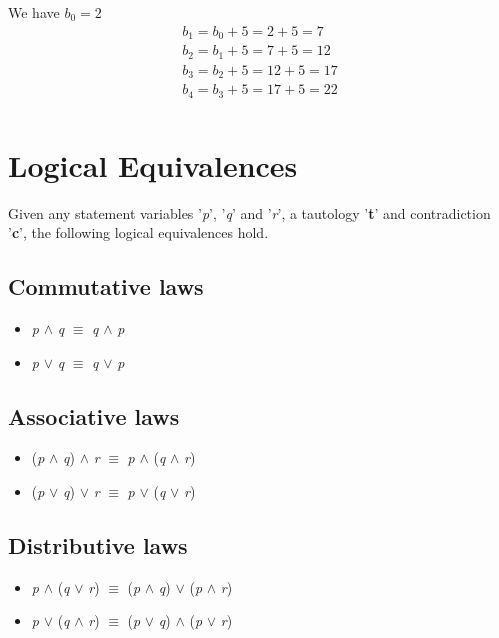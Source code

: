 \documentclass{article}
\begin{document}
We have $b_{0} = 2$
\begin{align}
b_{1} = b_{0} + 5 = 2 + 5 = 7 \\
b_{2} = b_{1} + 5 = 7 + 5 = 12 \\
b_{3} = b_{2} + 5 = 12 + 5 = 17 \\
b_{4} = b_{3} + 5 = 17 + 5 = 22 \\
\end{align}

\section{Logical Equivalences}

Given any statement variables '\textit{p}', '\textit{q}' and '\textit{r}', a tautology '\textbf{t}' and contradiction '\textbf{c}', the following
logical equivalences hold.


\subsection{Commutative laws}
\begin{itemize} 
\item \textit{p} $\wedge$ \textit{q} $\equiv$ \textit{q} $\wedge$ \textit{p}
\item \textit{p} $\lor$ \textit{q} $\equiv$ \textit{q} $\lor$ \textit{p}
\end{itemize}

\subsection{Associative laws}
\begin{itemize}
\item (\textit{p} $\wedge$ \textit{q}) $\wedge$ \textit{r} $\equiv$ \textit{p} $\wedge$ (\textit{q} $\wedge$ \textit{r})
\item (\textit{p} $\lor$ \textit{q}) $\lor$ \textit{r} $\equiv$ \textit{p} $\lor$ (\textit{q} $\lor$ \textit{r})
\end{itemize}

\subsection{Distributive laws}
\begin{itemize}
\item \textit{p} $\wedge$ (\textit{q} $\lor$ \textit{r}) $\equiv$ (\textit{p} $\wedge$ \textit{q}) $\lor$ (\textit{p} $\wedge$ \textit{r})
\item \textit{p} $\lor$ (\textit{q} $\wedge$ \textit{r}) $\equiv$ (\textit{p} $\lor$ \textit{q}) $\wedge$ (\textit{p} $\lor$ \textit{r})
\end{itemize}
\end{document}
